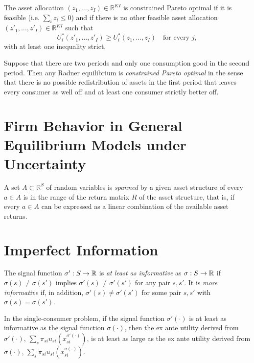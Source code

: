 \begin{defn}
    The asset allocation $(z_1, \dots, z_I) \in \mathbb{R}^{KI}$ is constrained Pareto optimal if it is feasible (i.e. $\sum_i z_i \leq 0$) and if there is no other feasible asset allocation $(z'_1, \dots, z'_I) \in \mathbb{R}^{KI}$ such that
    \begin{equation*}
        U^*_i(z'_1, \dots, z'_I) \geq U^*_i(z_1, \dots, z_I) \quad \text{for every } j,
    \end{equation*}
    with at least one inequality strict.
\end{defn}

\begin{prop}
    Suppose that there are two periods and only one consumption good in the second period. Then any Radner equilibrium is \emph{constrained Pareto optimal} in the sense that there is no possible redistribution of assets in the first period that leaves every consumer as well off and at least one consumer strictly better off.
\end{prop}


\section{Firm Behavior in General Equilibrium Models under Uncertainty}

\begin{defn}
    A set $A \subset \mathbb{R}^{S}$ of random variables is \emph{spanned} by a given asset structure of every $a \in A$ is in the range of the return matrix $R$ of the asset structure, that is, if every $a \in A$ can be expressed as a linear combination of the available asset returns.
\end{defn}


\section{Imperfect Information}

\begin{defn}
    The signal function $\sigma': S \to \mathbb{R}$ is \emph{at least as informative} as $\sigma: S \to \mathbb{R}$ if $\sigma(s) \neq \sigma(s')$ implies $\sigma'(s) \neq \sigma'(s')$ for any pair $s, s'$. It is \emph{more informative} if, in addition, $\sigma'(s) \neq \sigma'(s')$ for some pair $s, s'$ with $\sigma(s) = \sigma(s')$.
\end{defn}

\begin{prop}
    In the single-consumer problem, if the signal function $\sigma'(\cdot)$ is at least as informative as the signal function $\sigma(\cdot)$, then the ex ante utility derived from $\sigma'(\cdot)$, $\sum_s \pi_{si} u_{si} (x_{si}^{\sigma'(\cdot)})$, is at least as large as the ex ante utility derived from $\sigma(\cdot)$, $\sum_s \pi_{si} u_{si} (x_{si}^{\sigma(\cdot)})$.
\end{prop}

